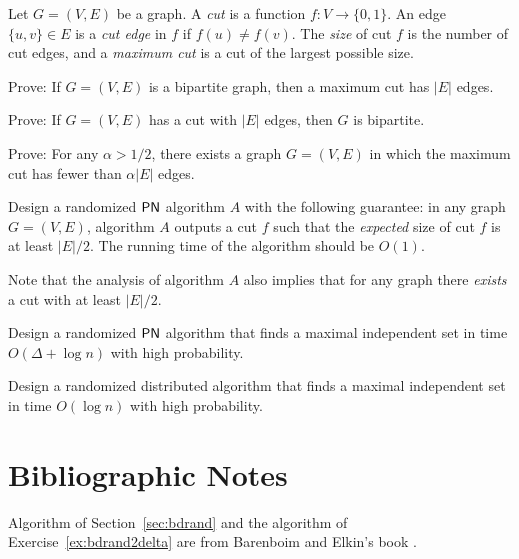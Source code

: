 \begin{ex}
    Let $G = (V,E)$ be a graph. A \emph{cut} is a function $f\colon V \to \{0,1\}$. An edge $\{u,v\} \in E$ is a \emph{cut edge} in $f$ if $f(u) \ne f(v)$. The \emph{size} of cut $f$ is the number of cut edges, and a \emph{maximum cut} is a cut of the largest possible size.
    \begin{subex}
        \item Prove: If $G = (V,E)$ is a bipartite graph, then a maximum cut has $|E|$ edges.
        \item Prove: If $G = (V,E)$ has a cut with $|E|$ edges, then $G$ is bipartite.
        \item Prove: For any $\alpha > 1/2$, there exists a graph $G = (V,E)$ in which the maximum cut has fewer than $\alpha |E|$ edges.
    \end{subex}
\end{ex}

\begin{ex}
    Design a randomized $\textup{\sffamily PN}$ algorithm $A$ with the following guarantee: in any graph $G = (V,E)$, algorithm $A$ outputs a cut $f$ such that the \emph{expected} size of cut $f$ is at least $|E|/2$. The running time of the algorithm should be $O(1)$.

    Note that the analysis of algorithm $A$ also implies that for any graph there \emph{exists} a cut with at least $|E|/2$.

\end{ex}

\begin{ex}
    Design a randomized $\textup{\sffamily PN}$ algorithm that finds a maximal independent set in time $O(\Delta + \log n)$ with high probability.

\end{ex}

\begin{exs}
    Design a randomized distributed algorithm that finds a maximal independent set in time $O(\log n)$ with high probability.

\end{exs}



\section{Bibliographic Notes}

Algorithm of Section~\ref{sec:bdrand} and the algorithm of Exercise~\ref{ex:bdrand2delta} are from Barenboim and Elkin's book \cite[Section 10.1]{barenboim13distributed}.
